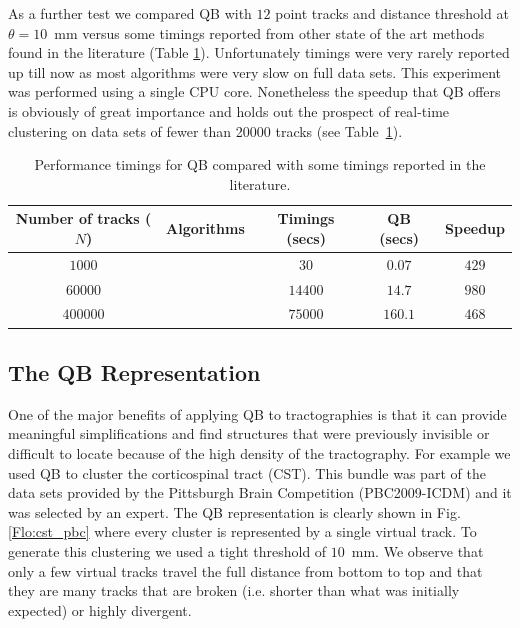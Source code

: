 \documentclass{bioinfo}
\begin{document}
As a further test we compared QB with $12$ point tracks and distance
threshold at $\theta=10$~mm versus some timings reported from other
state of the art methods found in the literature (Table
\ref{Flo:timings}). Unfortunately timings were very rarely reported up
till now as most algorithms were very slow on full data sets. This
experiment was performed using a single CPU core. Nonetheless the
speedup that QB offers is obviously of great importance and holds out
the prospect of real-time clustering on data sets of fewer than \num{20000}
tracks (see Table~\ref{Flo:timings}).

%
\begin{table}
\scriptsize\addtolength{\tabcolsep}{-5pt}
\caption{Performance timings for QB compared with some timings
  reported in the literature.\label{Flo:timings}}
\begin{centering}
\begin{tabular}{ccccc}
\hline 
Number of tracks ($N$) & Algorithms & Timings (secs) & QB (secs) & Speedup\tabularnewline
\hline
$1000$ & \citet{wang2010tractography} & $30$ & $0.07$ & $429$\tabularnewline
$\num{60000}$ & \citet{wang2010tractography} & $\num{14400}$ & $14.7$ & $980$\tabularnewline
$\num{400000}$ & \citet{Visser2010} & $\num{75000}$ & $160.1$ & $468$\tabularnewline
\hline
\end{tabular}
\par\end{centering}
\end{table}

\subsection{The QB Representation\label{QB_Representation}}

One of the major benefits of applying QB to tractographies is that it
can provide meaningful simplifications and find structures that were
previously invisible or difficult to locate because of the high density
of the tractography. For example we used QB to cluster the corticospinal
tract (CST). This bundle was part of the data sets provided by the
Pittsburgh Brain Competition (PBC2009-ICDM) and it was selected by an
expert. The QB representation is clearly shown in Fig.\ref{Flo:cst_pbc} where
every cluster is represented by a single virtual track. To generate this
clustering we used a tight threshold of $10$~mm. We observe that only a
few virtual tracks travel the full distance from bottom to top and that
they are many tracks that are broken (i.e. shorter than what was
initially expected) or highly divergent.
\end{document}
